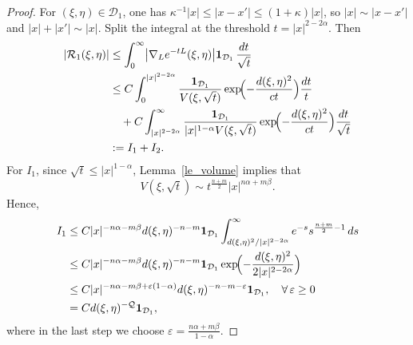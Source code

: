 \documentclass[12pt]{amsart}
\begin{document}
\begin{proof}
For $(\xi,\eta)\in \mathcal{D}_1$, one has $\kappa^{-1}|x| \le |x-x'| \le (1+\kappa)|x|$, so $|x|\sim |x-x'|$ and $|x|+|x'|\sim |x|$. Split the integral at the threshold $t = |x|^{2-2\alpha}$. Then
\begin{align*}
    |\mathcal{R}_1(\xi,\eta)|
    &\le \int_0^\infty \bigl| \nabla_L e^{-tL}(\xi,\eta) \bigr| \mathbf{1}_{\mathcal{D}_1} \, \frac{dt}{\sqrt{t}}\\
    &\le C\int_0^{|x|^{2-2\alpha}} \frac{\mathbf{1}_{\mathcal{D}_1}}{V(\xi,\sqrt{t})} \exp\!\Bigl( - \frac{d(\xi,\eta)^2}{c t} \Bigr) \frac{dt}{t}\\
    &\quad + C\int_{|x|^{2-2\alpha}}^\infty \frac{\mathbf{1}_{\mathcal{D}_1}}{|x|^{1-\alpha} V(\xi,\sqrt{t})} \exp\!\Bigl( - \frac{d(\xi,\eta)^2}{c t} \Bigr) \frac{dt}{\sqrt{t}} \\
    &:= I_1 + I_2.
\end{align*}
For $I_1$, since $\sqrt{t}\le |x|^{1-\alpha}$, Lemma~\ref{le_volume} implies that
\begin{equation*}
    V(\xi,\sqrt{t}) \sim t^{\frac{n+m}{2}} |x|^{n\alpha+m\beta}.
\end{equation*}
Hence,
\begin{align*}
    I_1
    &\le C |x|^{-n\alpha - m\beta} d(\xi,\eta)^{-n-m}\mathbf{1}_{\mathcal{D}_1} \int_{d(\xi,\eta)^2/|x|^{2-2\alpha}}^\infty e^{-s} s^{\frac{n+m}{2}-1} \, ds\\
    &\le C |x|^{-n\alpha - m\beta} d(\xi,\eta)^{-n-m}\mathbf{1}_{\mathcal{D}_1} \exp\!\Bigl( - \frac{d(\xi,\eta)^2}{2|x|^{2-2\alpha}} \Bigr)\\
    &\le C |x|^{-n\alpha-m\beta+\varepsilon(1-\alpha)} d(\xi,\eta)^{-n-m-\varepsilon} \mathbf{1}_{\mathcal{D}_1},\quad \forall\, \varepsilon\ge 0\\
    &= C d(\xi,\eta)^{-\mathcal{Q}} \mathbf{1}_{\mathcal{D}_1},
\end{align*}
where in the last step we choose $\varepsilon = \frac{n\alpha+m\beta}{1-\alpha}$.


\end{proof}
\end{document}
